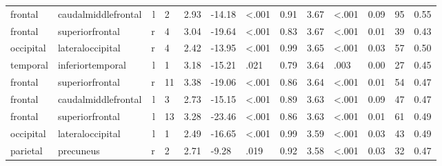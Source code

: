 \documentclass{article}
\begin{document}
\begin{longtable}{llrR{1.3cm}R{1cm}R{1.3cm}R{1cm}R{1cm}R{1.3cm}R{1cm}R{1.8cm}R{1.3cm}R{1.8cm}}
   frontal &       caudalmiddlefrontal &    l &         2 &                  2.93 &           -14.18 &      \textless.001 &                               0.91 &                          3.67 &                   \textless.001 &   0.09 &     95 &      0.55 \\
   frontal &           superiorfrontal &    r &         4 &                  3.04 &           -19.64 &      \textless.001 &                               0.83 &                          3.67 &                   \textless.001 &   0.01 &     39 &      0.43 \\
 occipital &          lateraloccipital &    r &         4 &                  2.42 &           -13.95 &      \textless.001 &                               0.99 &                          3.65 &                   \textless.001 &   0.03 &     57 &      0.50 \\
  temporal &          inferiortemporal &    l &         1 &                  3.18 &           -15.21 &               .021 &                               0.79 &                          3.64 &                            .003 &   0.00 &     27 &      0.45 \\
   frontal &           superiorfrontal &    r &        11 &                  3.38 &           -19.06 &      \textless.001 &                               0.86 &                          3.64 &                   \textless.001 &   0.01 &     54 &      0.47 \\
   frontal &       caudalmiddlefrontal &    l &         3 &                  2.73 &           -15.15 &      \textless.001 &                               0.89 &                          3.63 &                   \textless.001 &   0.09 &     47 &      0.47 \\
   frontal &           superiorfrontal &    l &        13 &                  3.28 &           -23.46 &      \textless.001 &                               0.86 &                          3.63 &                   \textless.001 &   0.01 &     61 &      0.49 \\
 occipital &          lateraloccipital &    l &         1 &                  2.49 &           -16.65 &      \textless.001 &                               0.99 &                          3.59 &                   \textless.001 &   0.03 &     43 &      0.49 \\
  parietal &                 precuneus &    r &         2 &                  2.71 &            -9.28 &               .019 &                               0.92 &                          3.58 &                   \textless.001 &   0.03 &     32 &      0.47 \\

\end{longtable}
\end{document}
